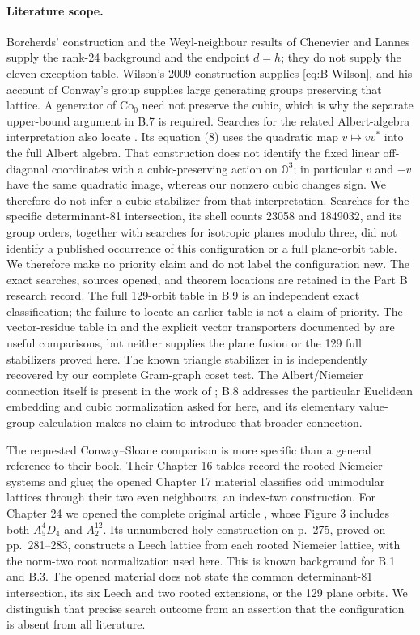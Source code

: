 \paragraph{Literature scope.}
Borcherds' construction and the Weyl-neighbour results of Chenevier and
Lannes supply the rank-24 background and the endpoint \(d=h\); they
do not supply the eleven-exception table. Wilson's 2009 construction
supplies \eqref{eq:B-Wilson}, and his account of Conway's group supplies
large generating groups preserving that lattice. A generator of
\(\mathrm{Co}_0\) need not preserve the cubic, which is why the
separate upper-bound argument in B.7 is required. Searches for the
related Albert-algebra interpretation also locate
\citet[Corollary 2.3 and Section 4]{B_Rios2018}. Its equation (8)
uses the quadratic map \(v\mapsto vv^*\) into the full Albert
algebra. That construction does not identify the fixed linear
off-diagonal coordinates with a cubic-preserving action on
\(\mathbb O^3\); in particular \(v\) and \(-v\) have the same
quadratic image, whereas our nonzero cubic changes sign. We
therefore do not infer a cubic stabilizer from that interpretation.
Searches for the specific determinant-81 intersection, its shell counts 23058 and
1849032, and its group orders, together with searches for isotropic
planes modulo three, did not identify a published occurrence of this
configuration or a full plane-orbit table. We therefore make no
priority claim and do not label the configuration new. The exact
searches, sources opened, and theorem locations are retained in the
Part B research record. The full 129-orbit table in B.9 is an
independent exact classification; the failure to locate an earlier
table is not a claim of priority. The vector-residue table in
\citet[Proposition 4.2 and Table 4.2]{B_MartinetLatticesMod} and the
explicit vector transporters documented by \citet{B_mmgroup2026}
are useful comparisons, but neither supplies the plane fusion or
the 129 full stabilizers proved here. The known triangle stabilizer
in \citet[Section 5]{B_Fairbairn2010} is independently recovered by
our complete Gram-graph coset test. The Albert/Niemeier connection
itself is present in the work of \citet{B_ElkiesGross2001}; B.8
addresses the particular Euclidean embedding and cubic normalization
asked for here, and its elementary value-group calculation makes no
claim to introduce that broader connection.

The requested Conway--Sloane comparison is more specific than a
general reference to their book. Their Chapter 16 tables record the
rooted Niemeier systems and glue; the opened Chapter 17 material
classifies odd unimodular lattices through their two even neighbours,
an index-two construction. For Chapter 24 we opened the complete
original article \citep{B_ConwaySloane1982Holy}, whose Figure 3
includes both \(A_5^4D_4\) and \(A_2^{12}\). Its unnumbered holy
construction on p.~275, proved on pp.~281--283, constructs a Leech
lattice from each rooted Niemeier lattice, with the norm-two root
normalization used here. This is known background for B.1 and B.3.
The opened material does not state the common determinant-81
intersection, its six Leech and two rooted extensions, or the
129 plane orbits. We distinguish that precise search outcome from
an assertion that the configuration is absent from all literature.
